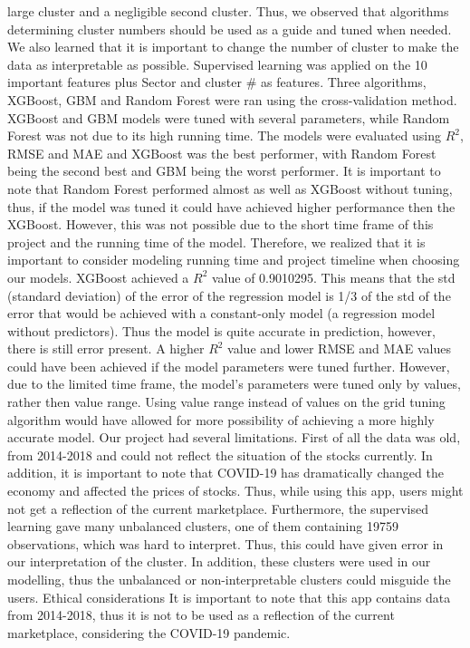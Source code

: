 \documentclass[11pt,]{article}
\begin{document}
large cluster and a negligible second cluster. Thus, we observed that
algorithms determining cluster numbers should be used as a guide and
tuned when needed. We also learned that it is important to change the
number of cluster to make the data as interpretable as possible.
Supervised learning was applied on the 10 important features plus Sector
and cluster \# as features. Three algorithms, XGBoost, GBM and Random
Forest were ran using the cross-validation method. XGBoost and GBM
models were tuned with several parameters, while Random Forest was not
due to its high running time. The models were evaluated using \(R^2\),
RMSE and MAE and XGBoost was the best performer, with Random Forest
being the second best and GBM being the worst performer. It is important
to note that Random Forest performed almost as well as XGBoost without
tuning, thus, if the model was tuned it could have achieved higher
performance then the XGBoost. However, this was not possible due to the
short time frame of this project and the running time of the model.
Therefore, we realized that it is important to consider modeling running
time and project timeline when choosing our models. XGBoost achieved a
\(R^2\) value of 0.9010295. This means that the std (standard deviation)
of the error of the regression model is 1/3 of the std of the error that
would be achieved with a constant-only model (a regression model without
predictors). Thus the model is quite accurate in prediction, however,
there is still error present. A higher \(R^2\) value and lower RMSE and
MAE values could have been achieved if the model parameters were tuned
further. However, due to the limited time frame, the model's parameters
were tuned only by values, rather then value range. Using value range
instead of values on the grid tuning algorithm would have allowed for
more possibility of achieving a more highly accurate model. Our project
had several limitations. First of all the data was old, from 2014-2018
and could not reflect the situation of the stocks currently. In
addition, it is important to note that COVID-19 has dramatically changed
the economy and affected the prices of stocks. Thus, while using this
app, users might not get a reflection of the current marketplace.
Furthermore, the supervised learning gave many unbalanced clusters, one
of them containing 19759 observations, which was hard to interpret.
Thus, this could have given error in our interpretation of the cluster.
In addition, these clusters were used in our modelling, thus the
unbalanced or non-interpretable clusters could misguide the users.
Ethical considerations It is important to note that this app contains
data from 2014-2018, thus it is not to be used as a reflection of the
current marketplace, considering the COVID-19 pandemic.
\end{document}
